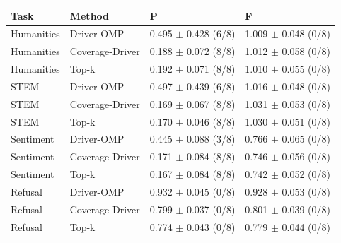 \begin{tabular}{llll}
\toprule
Task & Method & P & F \\
\midrule
Humanities & Driver-OMP & 0.495 $\pm$ 0.428 (6/8) & 1.009 $\pm$ 0.048 (0/8) \\
Humanities & Coverage-Driver & 0.188 $\pm$ 0.072 (8/8) & 1.012 $\pm$ 0.058 (0/8) \\
Humanities & Top-k & 0.192 $\pm$ 0.071 (8/8) & 1.010 $\pm$ 0.055 (0/8) \\
STEM & Driver-OMP & 0.497 $\pm$ 0.439 (6/8) & 1.016 $\pm$ 0.048 (0/8) \\
STEM & Coverage-Driver & 0.169 $\pm$ 0.067 (8/8) & 1.031 $\pm$ 0.053 (0/8) \\
STEM & Top-k & 0.170 $\pm$ 0.046 (8/8) & 1.030 $\pm$ 0.051 (0/8) \\
Sentiment & Driver-OMP & 0.445 $\pm$ 0.088 (3/8) & 0.766 $\pm$ 0.065 (0/8) \\
Sentiment & Coverage-Driver & 0.171 $\pm$ 0.084 (8/8) & 0.746 $\pm$ 0.056 (0/8) \\
Sentiment & Top-k & 0.167 $\pm$ 0.084 (8/8) & 0.742 $\pm$ 0.052 (0/8) \\
Refusal & Driver-OMP & 0.932 $\pm$ 0.045 (0/8) & 0.928 $\pm$ 0.053 (0/8) \\
Refusal & Coverage-Driver & 0.799 $\pm$ 0.037 (0/8) & 0.801 $\pm$ 0.039 (0/8) \\
Refusal & Top-k & 0.774 $\pm$ 0.043 (0/8) & 0.779 $\pm$ 0.044 (0/8) \\
\bottomrule
\end{tabular}
